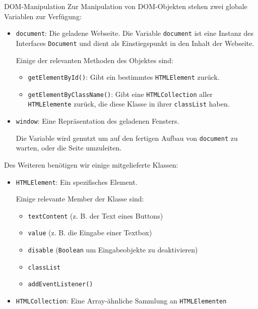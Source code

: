 \begin{defi}{DOM-Manipulation}
    Zur Manipulation von DOM-Objekten stehen zwei globale Variablen zur Verfügung:
    \begin{itemize}
        \item \texttt{document}: Die geladene Webseite.
              Die Variable \texttt{document} ist eine Instanz des Interfaces \texttt{Document} und dient als Einstiegspunkt in den Inhalt der Webseite.

              Einige der relevanten Methoden des Objektes sind:
              \begin{itemize}
                  \item \texttt{getElementById()}: Gibt ein bestimmtes \texttt{HTMLElement} zurück.
                  \item \texttt{getElementByClassName()}: Gibt eine \texttt{HTMLCollection} aller \texttt{HTMLElemente} zurück, die diese Klasse in ihrer \texttt{classList} haben.
              \end{itemize}
        \item \texttt{window}: Eine Repräsentation des geladenen Fensters.

              Die Variable wird genutzt um auf den fertigen Aufbau von \texttt{document} zu warten, oder die Seite umzuleiten.
    \end{itemize}

    Des Weiteren benötigen wir einige mitgelieferte Klassen:
    \begin{itemize}
        \item \texttt{HTMLElement}: Ein spezifisches Element.

              Einige relevante Member der Klasse sind:
              \begin{itemize}
                  \item \texttt{textContent} (z. B. der Text eines Buttons)
                  \item \texttt{value} (z. B. die Eingabe einer Textbox)
                  \item \texttt{disable} (\texttt{Boolean} um Eingabeobjekte zu deaktivieren)
                  \item \texttt{classList}
                  \item \texttt{addEventListener()}
              \end{itemize}
        \item \texttt{HTMLCollection}: Eine Array-ähnliche Sammlung an \texttt{HTMLElementen}


\end{itemize}
\end{defi}
